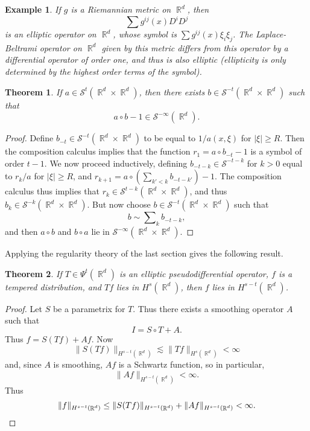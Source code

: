 \documentclass{article}
\DeclareMathOperator{\RR}{\mathbb{R}}
\theoremstyle{plain}
\newtheorem{theorem}{Theorem}
\newtheorem*{example}{Example}
\theoremstyle{definition}
\begin{document}
\begin{example}
    If $g$ is a Riemannian metric on $\RR^d$, then
    \[ \sum g^{ij}(x) D^i D^j \]
    is an elliptic operator on $\RR^d$, whose symbol is $\sum g^{ij}(x) \xi_i \xi_j$. The Laplace-Beltrami operator on $\RR^d$ given by this metric differs from this operator by a differential operator of order one, and thus is also elliptic (ellipticity is only determined by the highest order terms of the symbol).
\end{example}

\begin{theorem}
    If $a \in \mathcal{S}^t(\RR^d \times \RR^d)$, then there exists $b \in \mathcal{S}^{-t}(\RR^d \times \RR^d)$ such that
    \[ a \circ b - 1 \in \mathcal{S}^{-\infty}(\RR^d). \]
\end{theorem}
\begin{proof}
    Define $b_{-t} \in \mathcal{S}^{-t}(\RR^d \times \RR^d)$ to be equal to $1 / a(x,\xi)$ for $|\xi| \geq R$. Then the composition calculus implies that the function $r_1 = a \circ b_{-t} - 1$ is a symbol of order $t - 1$. We now proceed inductively, defining $b_{-t-k} \in \mathcal{S}^{-t-k}$ for $k > 0$ equal to $r_k / a$ for $|\xi| \geq R$, and $r_{k+1} = a \circ ( \sum_{k' < k} b_{-t-k'} ) - 1$. The composition calculus thus implies that $r_k \in \mathcal{S}^{t-k}(\RR^d \times \RR^d)$, and thus $b_k \in \mathcal{S}^{-k}(\RR^d \times \RR^d)$. But now choose $b \in \mathcal{S}^{-t}(\RR^d \times \RR^d)$ such that
    \[ b \sim \sum\nolimits_k b_{-t-k}, \]
    and then $a \circ b$ and $b \circ a$ lie in $\mathcal{S}^{-\infty}(\RR^d \times \RR^d)$.
\end{proof}

Applying the regularity theory of the last section gives the following result.

\begin{theorem}
    If $T \in \Psi^t(\RR^d)$ is an elliptic pseudodifferential operator, $f$ is a tempered distribution, and $Tf$ lies in $H^s(\RR^d)$, then $f$ lies in $H^{s-t}(\RR^d)$.
\end{theorem}
\begin{proof}
    Let $S$ be a parametrix for $T$. Thus there exists a smoothing operator $A$ such that
    \[ I = S \circ T + A. \]
    Thus $f = S(Tf) + Af$. Now
    \[ \| S(Tf) \|_{H^{s-t}(\RR^d)} \lesssim \| Tf \|_{H^s(\RR^d)} < \infty \]
    and, since $A$ is smoothing, $Af$ is a Schwartz function, so in particular,
    \[ \| Af \|_{H^{s-t}(\RR^d)} < \infty. \]
    Thus
    \[ \| f \|_{H^{s-t}(\RR^d)} \leq \| S(Tf) \|_{H^{s-t}(\RR^d)} + \| Af \|_{H^{s-t}(\RR^d)} < \infty. \qedhere \]
\end{proof}
\end{document}
